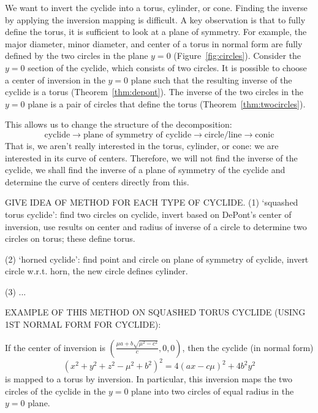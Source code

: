 {{We want to invert the cyclide into a torus, cylinder, or cone.
Finding the inverse by applying the inversion mapping is difficult.
A key observation is that to fully define the torus, it is sufficient 
to look at a plane of symmetry.
For example, the major diameter, minor diameter, and center of a torus
in normal form are fully defined by the two circles in the plane $y=0$ 
(Figure~\ref{fig:circles}).
Consider the $y=0$ section of the cyclide, which consists of two circles.
It is possible to choose a center of inversion in the $y=0$ plane such that 
the resulting inverse of the cyclide is a torus (Theorem~\ref{thm:depont}).
The inverse of the two circles in the $y=0$ plane is a pair of circles that
define the torus (Theorem~\ref{thm:twocircles}).

This allows us to change the structure of the decomposition:
%
\[ \mbox{cyclide} \rightarrow \mbox{plane of symmetry of cyclide}
\rightarrow \mbox{circle/line} \rightarrow \mbox{conic} \]
%
That is, we aren't really interested in the torus, cylinder, or cone:
we are interested in its curve of centers.
Therefore, we will not find the inverse of the cyclide,
we shall find the inverse of a plane of symmetry of the cyclide
and determine the curve of centers directly from this.



GIVE IDEA OF METHOD FOR EACH TYPE OF CYCLIDE.
(1) `squashed torus cyclide': find two circles on cyclide, invert based on 
DePont's center of inversion, use results on center and radius of inverse 
of a circle to determine two circles on torus; these define torus.

(2) `horned cyclide': find point and circle on plane of symmetry of cyclide,
invert circle w.r.t. horn, the new circle defines cylinder.

(3) ...


EXAMPLE OF THIS METHOD ON SQUASHED TORUS CYCLIDE (USING 1ST NORMAL FORM FOR 
CYCLIDE):

\begin{theorem}
\label{thm:depont}
\cite{DePont}
If the center of inversion is 
$(\frac{\mu a + b\sqrt{\mu^{2} - c^{2}}}{c},0,0)$,
then the cyclide (in normal form) 
\[ 
(x^{2} + y^{2} + z^{2} - \mu^{2} + b^{2})^{2} = 4(ax - c\mu)^{2} + 4b^{2}y^{2}
\]
is mapped to a torus by inversion.
In particular, this inversion maps the two circles of the cyclide in the
$y=0$ plane into two circles of equal radius in the $y=0$ plane.
\end{theorem}

}}
